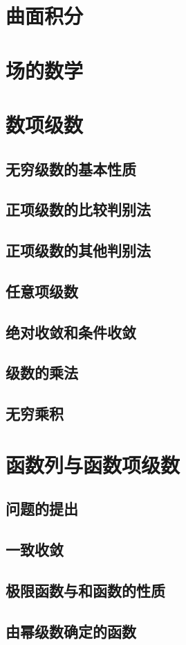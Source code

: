 \documentclass[a4paper, 11pt]{ctexbook}
\begin{document}
        \chapter{曲面积分}
        \chapter{场的数学}
        \chapter{数项级数}
            \section{无穷级数的基本性质}
                
            \section{正项级数的比较判别法}
                
            \section{正项级数的其他判别法}
                
            \section{任意项级数}
                
            \section{绝对收敛和条件收敛}
                
            \section{级数的乘法}
                
            \section{无穷乘积}
                
        \chapter{函数列与函数项级数}
            \section{问题的提出}
            \section{一致收敛}
                
            \section{极限函数与和函数的性质}
                
            \section{由幂级数确定的函数}
                
\end{document}
